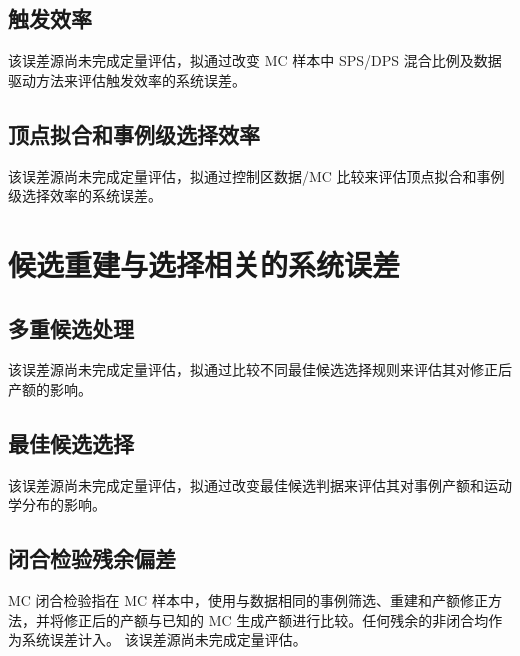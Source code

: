 \subsection{触发效率}
\label{subsec:syst-trigger-eff}

该误差源尚未完成定量评估，拟通过改变 MC 样本中 SPS/DPS 混合比例及数据驱动方法来评估触发效率的系统误差。

\subsection{顶点拟合和事例级选择效率}
\label{subsec:syst-vertex-event-eff}

该误差源尚未完成定量评估，拟通过控制区数据/MC 比较来评估顶点拟合和事例级选择效率的系统误差。

\section{候选重建与选择相关的系统误差}
\label{sec:syst-candidate-selection}

\subsection{多重候选处理}
\label{subsec:syst-multiple-candidates}

该误差源尚未完成定量评估，拟通过比较不同最佳候选选择规则来评估其对修正后产额的影响。

\subsection{最佳候选选择}
\label{subsec:syst-best-candidate}

该误差源尚未完成定量评估，拟通过改变最佳候选判据来评估其对事例产额和运动学分布的影响。

\subsection{闭合检验残余偏差}
\label{subsec:syst-closure-bias}

MC 闭合检验指在 MC 样本中，使用与数据相同的事例筛选、重建和产额修正方法，并将修正后的产额与已知的 MC 生成产额进行比较。任何残余的非闭合均作为系统误差计入。
该误差源尚未完成定量评估。

